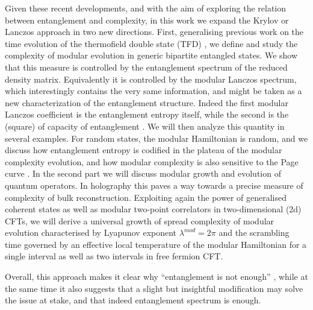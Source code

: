 \documentclass[aps,prl,twocolumn,showpacs,preprintnumbers,amsmath,amssymb]{revtex4-1}
\begin{document}
Given these recent developments, and with the aim of exploring the relation between entanglement and complexity, in this work we expand the Krylov or Lanczos approach in two new directions. First, generalising previous work on the time evolution of the thermofield double state (TFD) \cite{Balasubramanian:2022tpr}, we define and study the complexity of modular evolution in generic bipartite entangled states. We show that this measure is controlled by the entanglement spectrum of the reduced density matrix. Equivalently it is controlled by the modular Lanczos spectrum, which interestingly contains the very same information, and might be taken as a new characterization of the entanglement structure. Indeed the first modular Lanczos coefficient is the entanglement entropy itself, while the second is the (square) of capacity of entanglement \cite{Yao:2010woi,DeBoer:2018kvc}. We will then analyze this quantity in several examples. For random states, the modular Hamiltonian is random, and we discuss how entanglement entropy is codified in the plateau of the modular complexity evolution, and how modular complexity is also sensitive to the Page curve \cite{Page:1993df}. In the second part we will discuss  modular growth and evolution of quantum operators. In holography this paves a way towards a precise measure of complexity of bulk reconstruction. Exploiting again the power of generalised coherent states as well as modular two-point correlators in two-dimensional (2d) CFTs, we will derive a universal growth of spread complexity of modular evolution characterised by Lyapunov exponent $\lambda^{mod}=2\pi$ and the scrambling time governed by an effective local temperature of the modular Hamiltonian for a single interval as well as two intervals in free fermion CFT.

Overall, this approach makes it clear why ``entanglement is not enough'' \cite{Susskind:2014moa}, while at the same time it also suggests that a slight but insightful modification may solve the issue at stake, and that indeed entanglement spectrum is enough.
\end{document}
